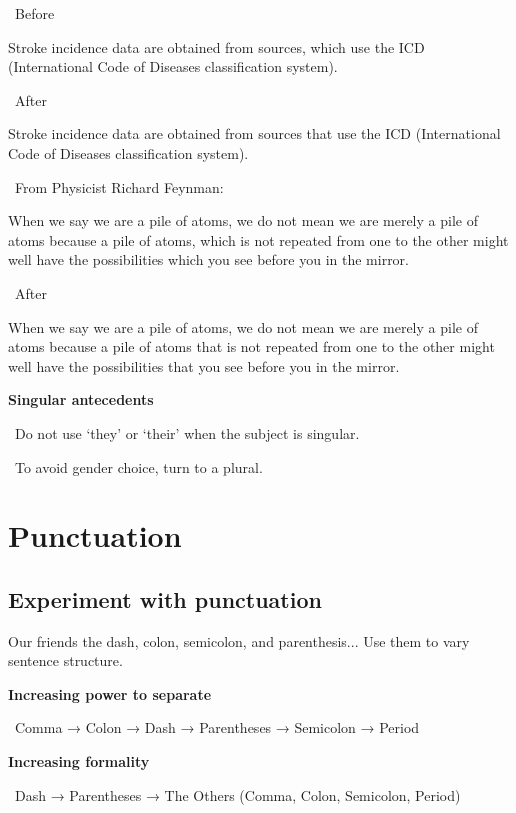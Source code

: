 \documentclass[a4paper, 12pt]{article}
\begin{document}
\newpage\par\textbullet\ Before
\par Stroke incidence data are obtained from sources, which use the ICD (International Code of Diseases classification system).

\par\textbullet\ After
\par Stroke incidence data are obtained from sources that use the ICD (International Code of Diseases classification system).

\par\textbullet\ From Physicist Richard Feynman:
\par When we say we are a pile of atoms, we do not mean we are merely a pile of atoms because a pile of atoms, which is not repeated from one to the other might well have the possibilities which you see before you in the mirror.

\par\textbullet\ After
\par When we say we are a pile of atoms, we do not mean we are merely a pile of atoms because a pile of atoms that is not repeated from one to the other might well have the possibilities that you see before you in the mirror.

\textbf{Singular antecedents}
\par\textbullet\ Do not use `they' or `their' when the subject is singular.
\par\textbullet\ To avoid gender choice, turn to a plural.

\newpage\section{Punctuation}

\subsection{Experiment with punctuation}

Our friends the dash, colon, semicolon, and parenthesis... Use them to vary sentence structure.

\textbf{Increasing power to separate}
\par\textbullet\ Comma → Colon → Dash → Parentheses → Semicolon → Period

\textbf{Increasing formality}
\par\textbullet\ Dash → Parentheses → The Others (Comma, Colon, Semicolon, Period)
\end{document}
